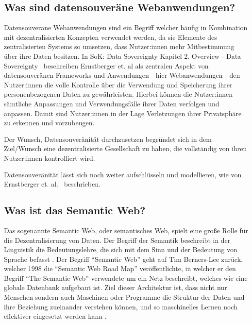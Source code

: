 \documentclass[acmtog]{acmart}
\begin{document}
\label{section:wasSindDatensouveräneWebanwendungen}
\subsection{Was sind datensouveräne Webanwendungen?}
Datensouveräne Webanwendungen sind ein Begriff welcher häufig in Kombination mit dezentralisierten Konzepten verwendet werden, da sie Elemente des zentralisierten Systems so umsetzen, dass Nutzer:innen mehr Mitbestimmung über ihre Daten besitzen.
In SoK: Data Sovereignty Kapitel 2. Overview - Data Sovereignty~\cite{cryptoeprint:2023/967} beschreiben Ernstberger et. al als zentralen Aspekt von datensouveränen Frameworks und Anwendungen - hier Webanwendungen - den Nutzer:innen die volle Kontrolle über die Verwendung und Speicherung ihrer personenbezogenen Daten zu gewährleisten. Hierbei können die Nutzer:innen sämtliche Anpassungen und Verwendungsfälle ihrer Daten verfolgen und anpassen. Damit sind Nutzer:innen in der Lage Verletzungen ihrer Privatsphäre zu erkennen und vorzubeugen.

Der Wunsch, Datensouveränität durchzusetzen begründet sich in dem Ziel/Wunsch eine dezentralisierte Gesellschaft zu haben, die vollständig von ihren Nutzer:innen kontrolliert wird. 

Datensouveränität lässt sich noch weiter aufschlüsseln und modellieren, wie von Ernstberger et. al.~\cite{cryptoeprint:2023/967} beschrieben.



\label{section:wasIstDasSemanticWeb}
\subsection{Was ist das Semantic Web?}

Das sogenannte Semantic Web, oder semantisches Web, spielt eine große Rolle für die Dezentralisierung von Daten. Der Begriff der Semantik beschreibt in der Linguistik die Bedeutungslehre, die sich mit dem Sinn und der Bedeutung von Sprache befasst \cite{blumauer2006semantic}.
Der Begriff "`Semantic Web"' geht auf Tim Berners-Lee zurück, welcher 1998 die "`Semantic Web Road Map"' veröffentlichte, in welcher er den Begriff "`The Semantic Web"' verwendete um ein Netz beschreibt, welches wie eine globale Datenbank aufgebaut ist. Ziel dieser Architektur ist, dass nicht nur Menschen sondern auch Maschinen oder Programme die Struktur der Daten und ihre Beziehung zueinander verstehen können, und so maschinelles Lernen noch effektiver eingesetzt werden kann \cite{bernerslee1998semanticwebroadmap}.
\end{document}
